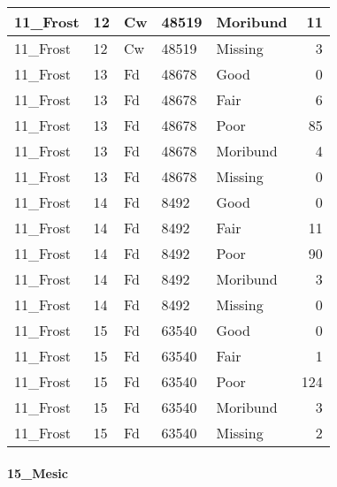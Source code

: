 \documentclass[
]{article}
\begin{document}
\begin{tabular}{l|l|l|l|l|r}
\hline
11\_Frost & 12 & Cw & 48519 & Moribund & 11\\
\hline
11\_Frost & 12 & Cw & 48519 & Missing & 3\\
\hline
11\_Frost & 13 & Fd & 48678 & Good & 0\\
\hline
11\_Frost & 13 & Fd & 48678 & Fair & 6\\
\hline
11\_Frost & 13 & Fd & 48678 & Poor & 85\\
\hline
11\_Frost & 13 & Fd & 48678 & Moribund & 4\\
\hline
11\_Frost & 13 & Fd & 48678 & Missing & 0\\
\hline
11\_Frost & 14 & Fd & 8492 & Good & 0\\
\hline
11\_Frost & 14 & Fd & 8492 & Fair & 11\\
\hline
11\_Frost & 14 & Fd & 8492 & Poor & 90\\
\hline
11\_Frost & 14 & Fd & 8492 & Moribund & 3\\
\hline
11\_Frost & 14 & Fd & 8492 & Missing & 0\\
\hline
11\_Frost & 15 & Fd & 63540 & Good & 0\\
\hline
11\_Frost & 15 & Fd & 63540 & Fair & 1\\
\hline
11\_Frost & 15 & Fd & 63540 & Poor & 124\\
\hline
11\_Frost & 15 & Fd & 63540 & Moribund & 3\\
\hline
11\_Frost & 15 & Fd & 63540 & Missing & 2\\
\hline
\end{tabular}

\hypertarget{mesic-7}{%
\paragraph{15\_Mesic}\label{mesic-7}}
\end{document}
